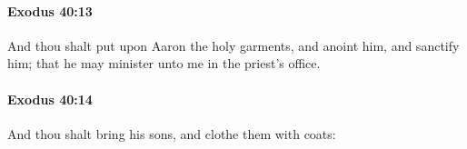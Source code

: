 		\paragraph{Exodus 40:13} %
			\label{EXODUS-40-13}

			And thou shalt put upon Aaron the holy garments, and anoint him, and sanctify him; that he may minister unto me in the priest's office.


		\paragraph{Exodus 40:14} %
			\label{EXODUS-40-14}

			And thou shalt bring his sons, and clothe them with coats:


